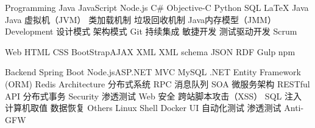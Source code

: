 

\begin{cvskills}

    
  \cvskill
    {Programming} %
    {Java \quad JavaScript \quad Node.js \quad C\# \quad Objective-C   \quad Python \quad SQL  \quad LaTeX} %
      \cvskill
    {Java} %
    {Java 虚拟机（JVM） \quad 类加载机制 \quad 垃圾回收机制 \quad Java内存模型（JMM）  } %
  \cvskill
    {Development} %
    {设计模式 \quad 架构模式 \quad Git \quad 持续集成 \quad 敏捷开发 \quad 测试驱动开发 \quad Scrum} %

  \cvskill
    {Web} %
    {HTML \quad CSS \quad BootStrap\quad AJAX \quad XML \quad XML schema \quad JSON \quad   RDF  \quad Gulp \quad npm } %

   \cvskill
    {Backend} %
    {Spring Boot \quad Node.js\quad ASP.NET MVC  \quad MySQL \quad  .NET Entity Framework (ORM) \quad  Redis} %
 \cvskill
    {Architecture} %
    {分布式系统 \quad RPC \quad 消息队列  \quad SOA \quad 微服务架构 \quad RESTful API \quad 分布式事务} %
 \cvskill
{Security} %
{渗透测试 \quad Web 安全 \quad 跨站脚本攻击（XSS） \quad SQL 注入 \quad 计算机取值 \quad 数据恢复   } %
 \cvskill
    {Others} %
    {  Linux \quad Shell \quad Docker \quad UI 自动化测试 \quad 渗透测试  \quad Anti-GFW } %
\end{cvskills}